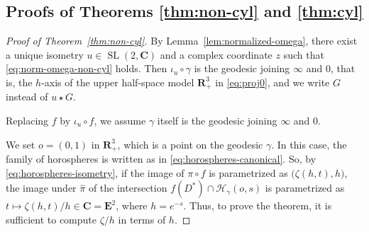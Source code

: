 \documentclass[a4paper]{amsart}
\theoremstyle{plain}
\theoremstyle{remark}
\numberwithin{equation}{section}
\begin{document}
\subsection*{Proofs of Theorems \ref{thm:non-cyl} and \ref{thm:cyl}}
\begin{proof}[Proof of Theorem~\ref{thm:non-cyl}]
 By Lemma~\ref{lem:normalized-omega},
 there exist a unique isometry $u\in{\operatorname{SL}}(2,{\boldsymbol{C}})$
 and a complex coordinate $z$ 
 such that \eqref{eq:norm-omega-non-cyl} holds.
 Then $\iota_u\circ\gamma$ is the geodesic joining $\infty$ and $0$,
 that is, the $h$-axis of the upper half-space model ${\boldsymbol{R}}^3_+$ in 
 \eqref{eq:proj0},
 and we write $G$ instead of $u\star G$.

 Replacing $f$ by $\iota_u\circ f$, we assume $\gamma$ itself
 is the geodesic joining $\infty$ and $0$.

 We set $o=(0,1)$ in ${\boldsymbol{R}}^3_+$,
 which is a point on the geodesic $\gamma$.
 In this case, the family of horospheres
 is written as in \eqref{eq:horospheres-canonical}.
 So, by \eqref{eq:horospheres-isometry},
 if the image of $\pi\circ f$ is parametrized as
 $\bigl(\zeta(h,t),h\bigr)$, 
 the image under $\hat\pi$ of the intersection 
 $f(D^*)\cap {\mathcal{H}}_{\gamma}(o,s)$ is parametrized
 as  $t\mapsto\zeta(h,t) / h \in {\boldsymbol{C}}={\boldsymbol{E}}^2$, where $h=e^{-s}$.
 Thus, to prove the theorem, it is sufficient 
 to compute $\zeta/h$ in terms of $h$.


\end{proof}
\end{document}
